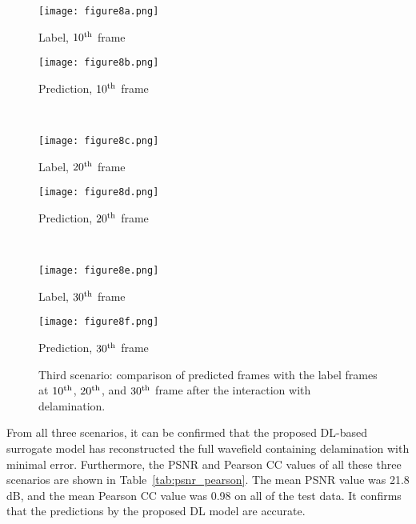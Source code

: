 \documentclass[pdflatex,sn-mathphys-num]{sn-jnl}%
\begin{document}
\begin{figure}
	\centering
	\begin{minipage}[b]{0.44\textwidth}
		\centering
		\texttt{[image: figure8a.png]}
		\caption*{Label, $10\textsuperscript{th}$ frame}
		\label{fig:num_462_label1}
	\end{minipage}
	\hfill
	\begin{minipage}[b]{0.44\textwidth}
		\centering
		\texttt{[image: figure8b.png]}
		\caption*{Prediction, $10\textsuperscript{th}$ frame}
		\label{fig:num_462_pred1}
	\end{minipage}
	\\
	\begin{minipage}[b]{0.44\textwidth}
		\centering
		\texttt{[image: figure8c.png]}
		\caption*{Label, $20\textsuperscript{th}$ frame}
		\label{fig:num_462_label2}
	\end{minipage}
	\hfill
	\begin{minipage}[b]{0.44\textwidth}
		\centering
		\texttt{[image: figure8d.png]}
		\caption*{Prediction, $20\textsuperscript{th}$ frame}
		\label{fig:num_462_pred2}
	\end{minipage}
	\\
	\begin{minipage}[b]{0.44\textwidth}
		\centering
		\texttt{[image: figure8e.png]}
		\caption*{Label, $30\textsuperscript{th}$ frame}
		\label{fig:num_462_label3}
	\end{minipage}
	\hfill
	\begin{minipage}[b]{0.44\textwidth}
		\centering
		\texttt{[image: figure8f.png]}
		\caption*{Prediction, $30\textsuperscript{th}$ frame }
		\label{fig:num_462_pred3}
	\end{minipage}
	\caption{Third scenario: comparison of predicted frames with the label 
	frames at $10\textsuperscript{th}$, $20\textsuperscript{th}$, and 
	$30\textsuperscript{th}$ frame after the interaction with 
	delamination.}
\label{fig:num_462}
\end{figure}
\clearpage
	From all three scenarios, it can be confirmed that the proposed DL-based 
	surrogate model has reconstructed the full wavefield containing 
	delamination with minimal error. 
	Furthermore, the PSNR and Pearson CC values of all these three scenarios 
	are shown in Table~\ref{tab:psnr_pearson}. 
	The mean PSNR value was 21.8 dB, and the mean Pearson CC value was 0.98 on 
	all of the test data.
	It confirms that the predictions by the proposed DL model are accurate.
	
\end{document}
